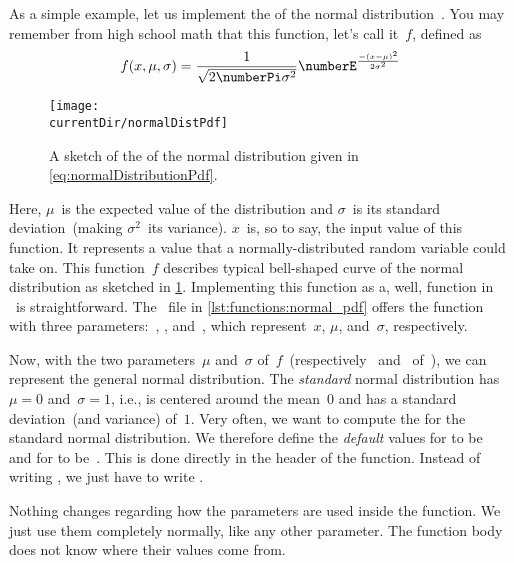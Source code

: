 As a simple example, let us implement the  of the normal distribution~\cite{AS1972HOMFWFGAMT,EHP2000SD,W2007HBOSDFE}.
You may remember from high school math that this function, let's call it~$f$, defined as%
%
\begin{equation}%
f(x, \mu, \sigma) = \frac{1}{\sqrt{2\numberPi\sigma^2}} \numberE^{\frac{-(x-\mu)^2}{2\sigma^2}}%
\label{eq:normalDistributionPdf}%
\end{equation}%
%
\begin{figure}%
\centering%
\texttt{[image: \\currentDir/normalDistPdf]}%
\caption{A sketch of the  of the normal distribution given in \cref{eq:normalDistributionPdf}.}%
\label{fig:normalDistPdf}%
\end{figure}%
%
Here, $\mu$~is the expected value of the distribution and $\sigma$~is its standard deviation~(making $\sigma^2$~its variance).
$x$~is, so to say, the input value of this function.
It represents a value that a normally-distributed random variable could take on.
This function~$f$ describes typical bell-shaped curve of the normal distribution as sketched in \cref{fig:normalDistPdf}.
Implementing this function as a, well, function in \python\ is straightforward.
The \python\ file  in \cref{lst:functions:normal_pdf} offers the function  with three parameters:~, , and~, which represent~$x$, $\mu$, and~$\sigma$, respectively.%
%
\begin{sloppypar}%
Now, with the two parameters~$\mu$ and~$\sigma$ of~$f$~(respectively~ and~ of~), we can represent the general normal distribution.
The \emph{standard} normal distribution has~$\mu=0$ and~$\sigma=1$, i.e., is centered around the mean~$0$ and has a standard deviation~(and variance) of~$1$.
Very often, we want to compute the  for the standard normal distribution.
We therefore define the \emph{default} values for  to be~ and for  to be~.
This is done directly in the header of the function.
Instead of writing , we just have to write .%
\end{sloppypar}%
%
Nothing changes regarding how the parameters are used inside the function.
We just use them completely normally, like any other parameter.
The function body does not know where their values come from.

